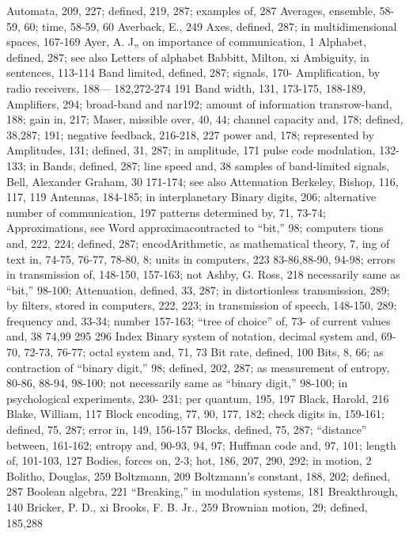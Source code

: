 {{{{{{{{{{{{{{{Automata, 209, 227; defined, 219, 287;
examples of, 287
Averages, ensemble, 58-59, 60; time,
58-59, 60
Averback, E., 249
Axes, defined, 287; in multidimensional
spaces, 167-169
Ayer, A. J„ on importance of communication,
1
Alphabet, defined, 287; see also Letters
of alphabet
Babbitt, Milton, xi
Ambiguity, in sentences, 113-114
Band limited, defined, 287; signals, 170-
Amplification, by radio receivers, 188—
182,272-274
191
Band width, 131, 173-175, 188-189,
Amplifiers, 294; broad-band and nar192; amount of information transrow-band,
188; gain in, 217; Maser,
missible
over, 40, 44; channel
capacity and, 178; defined, 38,287;
191; negative feedback, 216-218,
227
power and, 178; represented by
Amplitudes, 131; defined, 31, 287; in
amplitude, 171
pulse code modulation, 132-133; in
Bands, defined, 287; line speed and, 38
samples of band-limited signals,
Bell, Alexander Graham, 30
171-174; see also Attenuation
Berkeley, Bishop, 116, 117, 119
Antennas, 184-185; in interplanetary
Binary digits, 206; alternative number of
communication, 197
patterns determined by, 71, 73-74;
Approximations, see Word approximacontracted to “bit,” 98; computers
tions
and, 222, 224; defined, 287; encodArithmetic, as mathematical theory, 7,
ing
of text in, 74-75, 76-77, 78-80,
8; units in computers, 223
83-86,88-90, 94-98; errors in transmission
of, 148-150, 157-163; not
Ashby, G. Ross, 218
necessarily same as “bit,” 98-100;
Attenuation, defined, 33, 287; in distortionless
transmission, 289; by filters,
stored in computers, 222, 223; in transmission of speech, 148-150,
289; frequency and, 33-34; number
157-163; “tree of choice” of, 73-
of current values and, 38
74,99
295
296 Index
Binary system of notation, decimal system
and, 69-70, 72-73, 76-77; octal
system and, 71, 73
Bit rate, defined, 100
Bits, 8, 66; as contraction of “binary
digit,” 98; defined, 202, 287; as
measurement of entropy, 80-86,
88-94, 98-100; not necessarily
same as “binary digit,” 98-100; in
psychological experiments, 230-
231; per quantum, 195, 197
Black, Harold, 216
Blake, William, 117
Block encoding, 77, 90, 177, 182; check
digits in, 159-161; defined, 75, 287;
error in, 149, 156-157
Blocks, defined, 75, 287; “distance”
between, 161-162; entropy and,
90-93, 94, 97; Huffman code and,
97, 101; length of, 101-103, 127
Bodies, forces on, 2-3; hot, 186, 207,
290, 292; in motion, 2
Bolitho, Douglas, 259
Boltzmann, 209
Boltzmann’s constant, 188, 202; defined,
287
Boolean algebra, 221
“Breaking,” in modulation systems, 181
Breakthrough, 140
Bricker, P. D., xi
Brooks, F. B. Jr., 259
Brownian motion, 29; defined, 185,288
}}}}}}}}}}}}}}}
